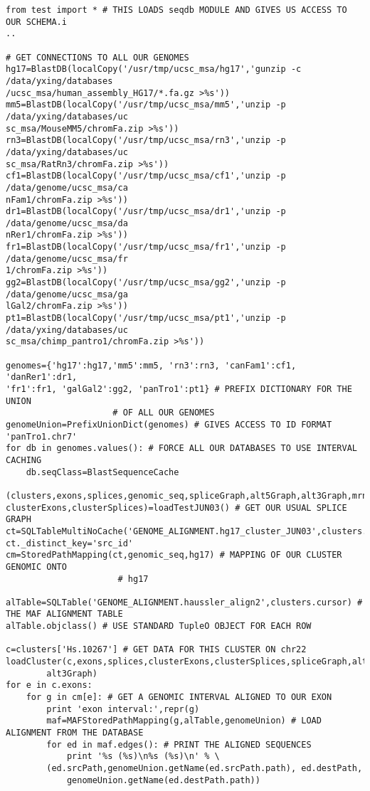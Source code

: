 \documentclass{howto}
\begin{document}
\begin{verbatim}
from test import * # THIS LOADS seqdb MODULE AND GIVES US ACCESS TO OUR SCHEMA.i
..

# GET CONNECTIONS TO ALL OUR GENOMES
hg17=BlastDB(localCopy('/usr/tmp/ucsc_msa/hg17','gunzip -c /data/yxing/databases
/ucsc_msa/human_assembly_HG17/*.fa.gz >%s'))
mm5=BlastDB(localCopy('/usr/tmp/ucsc_msa/mm5','unzip -p /data/yxing/databases/uc
sc_msa/MouseMM5/chromFa.zip >%s'))
rn3=BlastDB(localCopy('/usr/tmp/ucsc_msa/rn3','unzip -p /data/yxing/databases/uc
sc_msa/RatRn3/chromFa.zip >%s'))
cf1=BlastDB(localCopy('/usr/tmp/ucsc_msa/cf1','unzip -p /data/genome/ucsc_msa/ca
nFam1/chromFa.zip >%s'))
dr1=BlastDB(localCopy('/usr/tmp/ucsc_msa/dr1','unzip -p /data/genome/ucsc_msa/da
nRer1/chromFa.zip >%s'))
fr1=BlastDB(localCopy('/usr/tmp/ucsc_msa/fr1','unzip -p /data/genome/ucsc_msa/fr
1/chromFa.zip >%s'))
gg2=BlastDB(localCopy('/usr/tmp/ucsc_msa/gg2','unzip -p /data/genome/ucsc_msa/ga
lGal2/chromFa.zip >%s'))
pt1=BlastDB(localCopy('/usr/tmp/ucsc_msa/pt1','unzip -p /data/yxing/databases/uc
sc_msa/chimp_pantro1/chromFa.zip >%s'))

genomes={'hg17':hg17,'mm5':mm5, 'rn3':rn3, 'canFam1':cf1, 'danRer1':dr1,
'fr1':fr1, 'galGal2':gg2, 'panTro1':pt1} # PREFIX DICTIONARY FOR THE UNION 
					 # OF ALL OUR GENOMES
genomeUnion=PrefixUnionDict(genomes) # GIVES ACCESS TO ID FORMAT 'panTro1.chr7'
for db in genomes.values(): # FORCE ALL OUR DATABASES TO USE INTERVAL CACHING
    db.seqClass=BlastSequenceCache

(clusters,exons,splices,genomic_seq,spliceGraph,alt5Graph,alt3Graph,mrna,protein, 
clusterExons,clusterSplices)=loadTestJUN03() # GET OUR USUAL SPLICE GRAPH
ct=SQLTableMultiNoCache('GENOME_ALIGNMENT.hg17_cluster_JUN03',clusters.cursor)
ct._distinct_key='src_id'
cm=StoredPathMapping(ct,genomic_seq,hg17) # MAPPING OF OUR CLUSTER GENOMIC ONTO 
					  # hg17

alTable=SQLTable('GENOME_ALIGNMENT.haussler_align2',clusters.cursor) # THE MAF ALIGNMENT TABLE
alTable.objclass() # USE STANDARD TupleO OBJECT FOR EACH ROW

c=clusters['Hs.10267'] # GET DATA FOR THIS CLUSTER ON chr22
loadCluster(c,exons,splices,clusterExons,clusterSplices,spliceGraph,alt5Graph,
	    alt3Graph)
for e in c.exons:
    for g in cm[e]: # GET A GENOMIC INTERVAL ALIGNED TO OUR EXON
        print 'exon interval:',repr(g)
        maf=MAFStoredPathMapping(g,alTable,genomeUnion) # LOAD ALIGNMENT FROM THE DATABASE
        for ed in maf.edges(): # PRINT THE ALIGNED SEQUENCES
            print '%s (%s)\n%s (%s)\n' % \
	    (ed.srcPath,genomeUnion.getName(ed.srcPath.path), ed.destPath,
            genomeUnion.getName(ed.destPath.path))
\end{verbatim}
\end{document}
